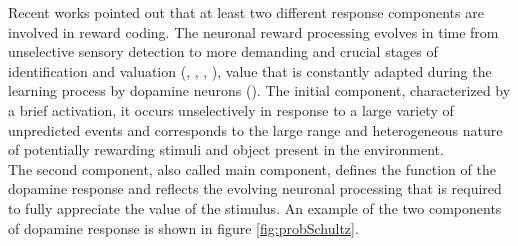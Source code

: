   Recent works pointed out that at least two different response components are involved in reward coding. The neuronal reward processing evolves in time from unselective sensory detection to more demanding and crucial stages of identification and valuation (\cite{Tobler2003}, \cite{Nomoto2010}, \cite{Fiorillo2013}, \cite{Schultz2016}), value that is constantly adapted during the learning process by dopamine neurons (\cite{Tobler2005}). The initial component, characterized by a brief activation, it occurs unselectively in response to a large variety of unpredicted events and corresponds to the large range and heterogeneous nature of potentially rewarding stimuli and object present in the environment.\\The second component, also called main component, defines the function of the dopamine response and reflects the evolving neuronal processing that is required to fully appreciate the value of the stimulus. An example of the two components of dopamine response is shown in figure \ref{fig:probSchultz}.\\
